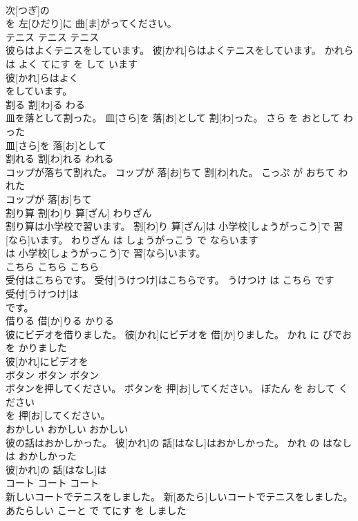 \documentclass[8pt]{extreport}
\begin{document}
\begin{CJK}{UTF8}{min}
\\	次[つぎ]の
\\	を 左[ひだり]に 曲[ま]がってください。			
\\	テニス	テニス	テニス	
\\	彼らはよくテニスをしています。	彼[かれ]らはよくテニスをしています。	かれら は よく てにす を して います	
\\	彼[かれ]らはよく
\\	をしています。			
\\	割る	割[わ]る	わる	
\\	皿を落として割った。	皿[さら]を 落[お]として 割[わ]った。	さら を おとして わった	
\\	皿[さら]を 落[お]として
\\	割れる	割[わ]れる	われる	
\\	コップが落ちて割れた。	コップが 落[お]ちて 割[わ]れた。	こっぷ が おちて われた	
\\	コップが 落[お]ちて
\\	割り算	割[わ]り 算[ざん]	わりざん	
\\	割り算は小学校で習います。	割[わ]り 算[ざん]は 小学校[しょうがっこう]で 習[なら]います。	わりざん は しょうがっこう で ならいます	
\\	は 小学校[しょうがっこう]で 習[なら]います。			
\\	こちら	こちら	こちら	
\\	受付はこちらです。	受付[うけつけ]はこちらです。	うけつけ は こちら です	
\\	受付[うけつけ]は
\\	です。			
\\	借りる	借[か]りる	かりる	
\\	彼にビデオを借りました。	彼[かれ]にビデオを 借[か]りました。	かれ に びでお を かりました	
\\	彼[かれ]にビデオを
\\	ボタン	ボタン	ボタン	
\\	ボタンを押してください。	ボタンを 押[お]してください。	ぼたん を おして ください	
\\	を 押[お]してください。			
\\	おかしい	おかしい	おかしい	
\\	彼の話はおかしかった。	彼[かれ]の 話[はなし]はおかしかった。	かれ の はなし は おかしかった	
\\	彼[かれ]の 話[はなし]は
\\	コート	コート	コート	
\\	新しいコートでテニスをしました。	新[あたら]しいコートでテニスをしました。	あたらしい こーと で てにす を しました	

\end{CJK}
\end{document}

